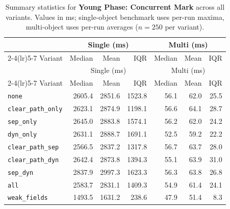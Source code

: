 \begin{longtable}{l rrr rrr}
\caption[Young Phase: Concurrent Mark summary statistics]{Summary statistics for \textbf{Young Phase: Concurrent Mark} across all variants. Values in ms; single-object benchmark uses per-run maxima, multi-object uses per-run averages ($n=250$ per variant).}\label{tab:stats-young-concurrent-mark} \\
\toprule
 & \multicolumn{3}{c}{Single (ms)} & \multicolumn{3}{c}{Multi (ms)} \\
\cmidrule(lr){2-4}\cmidrule(lr){5-7}
Variant & Median & Mean & IQR & Median & Mean & IQR \\
\midrule
\endfirsthead
\toprule
 & \multicolumn{3}{c}{Single (ms)} & \multicolumn{3}{c}{Multi (ms)} \\
\cmidrule(lr){2-4}\cmidrule(lr){5-7}
Variant & Median & Mean & IQR & Median & Mean & IQR \\
\midrule
\endhead
\bottomrule
\endfoot
\texttt{none} & 2605.4 & 2851.6 & 1523.8 & 56.1 & 62.0 & 25.5 \\
\texttt{clear\_path\_only} & 2623.1 & 2874.9 & 1198.1 & 56.6 & 64.1 & 28.7 \\
\texttt{sep\_only} & 2645.0 & 2883.8 & 1574.1 & 56.2 & 62.0 & 24.2 \\
\texttt{dyn\_only} & 2631.1 & 2888.7 & 1691.1 & 52.5 & 59.2 & 22.2 \\
\texttt{clear\_path\_sep} & 2566.5 & 2837.2 & 1317.8 & 56.7 & 63.7 & 28.0 \\
\texttt{clear\_path\_dyn} & 2642.4 & 2873.8 & 1394.3 & 55.1 & 63.9 & 31.0 \\
\texttt{sep\_dyn} & 2837.9 & 2997.3 & 1623.3 & 56.3 & 63.8 & 26.8 \\
\texttt{all} & 2583.7 & 2831.1 & 1409.3 & 54.9 & 61.4 & 24.1 \\
\texttt{weak\_fields} & 1493.5 & 1631.2 & 238.6 & 47.9 & 51.4 & 8.3 \\
\end{longtable}
